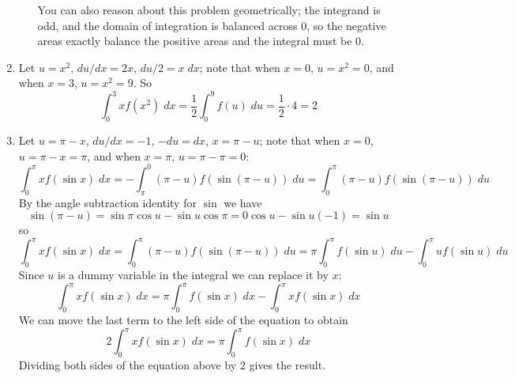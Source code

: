 \documentclass{article}
\begin{document}
\begin{enumerate}
\begin{enumerate}
    You can also reason about this problem geometrically; the
    integrand is odd, and the domain of integration is balanced across
    $0$, so the negative areas exactly balance the positive areas and
    the integral must be $0$. %
  \end{enumerate}
\item Let $u=x^2$, $du/dx = 2x$, $du/2 = x\; dx$; note that when
  $x=0$, $u=x^2=0$, and when $x=3$, $u=x^2=9$.  So
  \begin{equation*}
    \int_0^3 xf(x^2)\; dx
    = \frac{1}{2} \int_0^9 f(u) \; du
    = \frac{1}{2} \cdot 4 = 2
  \end{equation*}
\item Let $u=\pi-x$, $du/dx = -1$, $-du = dx$, $x=\pi-u$; note that
  when $x=0$, $u=\pi-x=\pi$, and when $x=\pi$, $u=\pi-\pi=0$:
  \begin{equation*}
    \int_0^\pi x f(\sin x) \; dx
    = -\int_\pi^0 (\pi-u) f(\sin(\pi-u)) \; du
    = \int_0^\pi (\pi-u) f(\sin(\pi-u)) \; du
  \end{equation*}
  By the angle subtraction identity for $\sin$ we have
  \begin{equation*}
    \sin(\pi-u) = \sin\pi\cos u - \sin u \cos \pi
    = 0\cos u - \sin u (-1)
    = \sin u
  \end{equation*}
  so
  \begin{equation*}
    \int_0^\pi x f(\sin x) \; dx
    = \int_0^\pi (\pi-u) f(\sin(\pi-u)) \; du
    = \pi \int_0^\pi f(\sin u) \; du - \int_0^\pi u f(\sin u) \; du
  \end{equation*}
  Since $u$ is a dummy variable in the integral we can replace it by
  $x$:
  \begin{equation*}
    \int_0^\pi x f(\sin x) \; dx
    = \pi \int_0^\pi f(\sin x) \; dx - \int_0^\pi x f(\sin x) \; dx
  \end{equation*}
  We can move the last term to the left side of the equation to obtain
  \begin{equation*}
    2\int_0^\pi x f(\sin x) \; dx
    = \pi \int_0^\pi f(\sin x) \; dx
  \end{equation*}
  Dividing both sides of the equation above by $2$ gives the result.
\end{enumerate}
\end{document}
